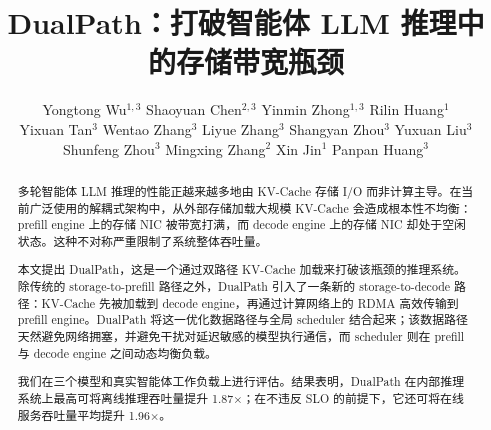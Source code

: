 \documentclass[sigconf,screen]{acmart}
\newcommand{\sysname}{DualPath\xspace}
\begin{document}
\title{DualPath：打破智能体 LLM 推理中的存储带宽瓶颈}

\author{Yongtong Wu$^{1,3}$ \enspace Shaoyuan Chen$^{2,3}$ \enspace Yinmin Zhong$^{1,3}$ \enspace Rilin Huang$^1$\\ 
Yixuan Tan$^3$ \enspace Wentao Zhang$^3$ \enspace Liyue Zhang$^3$ \enspace Shangyan Zhou$^3$ \enspace Yuxuan Liu$^3$ \enspace Shunfeng Zhou$^3$ \enspace Mingxing Zhang$^2$ \enspace Xin Jin$^1$ \enspace Panpan Huang$^3$}


\renewcommand{\shortauthors}{Wu et al.}
\def\shorttitle{\sysname}

\begin{abstract}

多轮智能体 LLM 推理的性能正越来越多地由 KV-Cache 存储 I/O 而非计算主导。在当前广泛使用的解耦式架构中，从外部存储加载大规模 KV-Cache 会造成根本性不均衡：prefill engine 上的存储 NIC 被带宽打满，而 decode engine 上的存储 NIC 却处于空闲状态。这种不对称严重限制了系统整体吞吐量。

本文提出 \sysname，这是一个通过双路径 KV-Cache 加载来打破该瓶颈的推理系统。除传统的 storage-to-prefill 路径之外，\sysname 引入了一条新的 storage-to-decode 路径：KV-Cache 先被加载到 decode engine，再通过计算网络上的 RDMA 高效传输到 prefill engine。\sysname 将这一优化数据路径与全局 scheduler 结合起来；该数据路径天然避免网络拥塞，并避免干扰对延迟敏感的模型执行通信，而 scheduler 则在 prefill 与 decode engine 之间动态均衡负载。

我们在三个模型和真实智能体工作负载上进行评估。结果表明，\sysname 在内部推理系统上最高可将离线推理吞吐量提升 1.87$\times$；在不违反 SLO 的前提下，它还可将在线服务吞吐量平均提升 1.96$\times$。

\end{abstract}


\maketitle






\appendix

\end{document}
